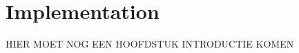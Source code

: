 \chapter{Implementation}
HIER MOET NOG EEN HOOFDSTUK INTRODUCTIE KOMEN

\pagebreak

\pagebreak

\pagebreak